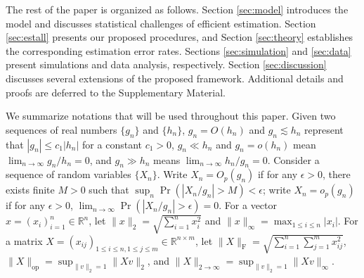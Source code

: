 \documentclass[12pt]{article}
\newcommand{\blue}[1]{\textcolor{blue}{#1}}
\begin{document}


The rest of the paper is organized as follows. Section \ref{sec:model} introduces the model and discusses statistical challenges  of efficient estimation.
Section \ref{sec:estall} presents our proposed procedures, and 
Section \ref{sec:theory} establishes the corresponding estimation error rates.  
Sections \ref{sec:simulation} and \ref{sec:data} present simulations and data analysis, respectively. 
Section \ref{sec:discussion} discusses several extensions of the proposed framework. 
Additional details and proofs are deferred to the Supplementary Material.



We summarize notations that will be used throughout this paper. Given two sequences of real numbers $\{g_n\}$ and $\{h_n\}$, 
$g_n = O(h_n) $ and $g_n\lesssim h_n $
represent that $|g_n|\leqslant c_1|h_n|$ for a constant $c_1>0$, {$g_n\ll h_n$} and $g_n=o(h_n)$ mean $\lim_{n\to \infty} g_n/h_n=0$, and {$g_n\gg h_n$ means $\lim_{n\to \infty}h_n/g_n=0$}. 
Consider a sequence of random variables $\{X_n\}$.
Write $X_n=O_p(g_n)$ if for any $\epsilon>0$, there exists finite $M>0$ such that $\sup_n \Pr(|X_n/g_n|>M)<\epsilon$;  
{write $X_n=o_p(g_n)$ if for any $\epsilon>0$, $\lim_{n\to \infty}\Pr(|X_n/g_n|>\epsilon) =0$.}  
For a vector $x = (x_i)_{i=1}^n \in \mathbb R^n$, 
let $\|x\|_2 = \sqrt{\sum_{i = 1}^n x_i^2}$  and $\|x\|_{\infty} = \max_{1\leqslant i \leqslant n}|x_i|$. 
For a matrix $X = (x_{ij})_{1\leqslant i\leqslant n, 1\leqslant j\leqslant m} \in \mathbb R^{n \times m}$, 
let $\|X\|_{\mathrm{F}} = \sqrt{\sum_{i = 1}^n \sum_{j = 1}^m x_{ij}^2}$, $\|X\|_{\operatorname{op}} = \sup_{\|v\|_2 = 1} \|Xv\|_2$,  and $\|X\|_{2 \to \infty} = \sup_{\|v\|_2 = 1} \|Xv\|_\infty$.
\end{document}
